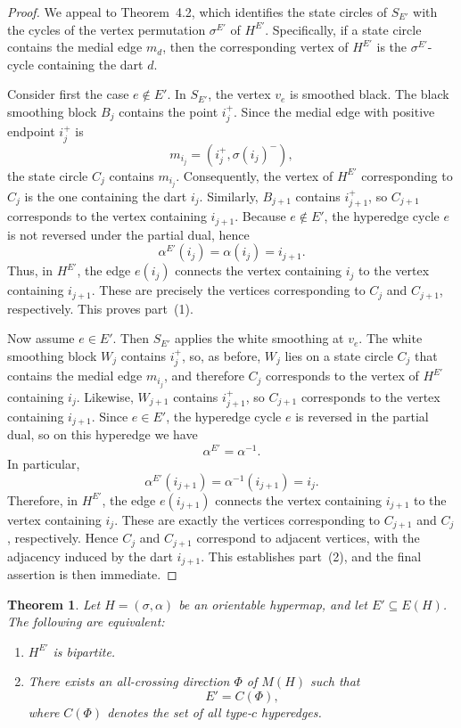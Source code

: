\documentclass{article}
\newtheorem{theorem}{Theorem}[section]
\begin{document}
\begin{proof}
We appeal to Theorem~4.2, which identifies the state circles of \(S_{E'}\) with
the cycles of the vertex permutation \(\sigma^{E'}\) of \(H^{E'}\).
Specifically, if a state circle contains the medial edge \(m_d\), then the
corresponding vertex of \(H^{E'}\) is the \(\sigma^{E'}\)-cycle containing the
dart \(d\).

Consider first the case \(e\notin E'\). In \(S_{E'}\), the vertex \(v_e\) is
smoothed black. The black smoothing block \(B_j\) contains the point
\(i_j^+\). Since the medial edge with positive endpoint \(i_j^+\) is
\[
m_{i_j}=(i_j^+,\sigma(i_j)^-),
\]
the state circle \(C_j\) contains \(m_{i_j}\). Consequently, the vertex of
\(H^{E'}\) corresponding to \(C_j\) is the one containing the dart \(i_j\).
Similarly, \(B_{j+1}\) contains \(i_{j+1}^+\), so \(C_{j+1}\) corresponds to
the vertex containing \(i_{j+1}\). Because \(e\notin E'\), the hyperedge cycle
\(e\) is not reversed under the partial dual, hence
\[
\alpha^{E'}(i_j)=\alpha(i_j)=i_{j+1}.
\]
Thus, in \(H^{E'}\), the edge \(e(i_j)\) connects the vertex containing
\(i_j\) to the vertex containing \(i_{j+1}\). These are precisely the
vertices corresponding to \(C_j\) and \(C_{j+1}\), respectively. This proves
part~(1).

Now assume \(e\in E'\). Then \(S_{E'}\) applies the white smoothing at
\(v_e\). The white smoothing block \(W_j\) contains \(i_j^+\), so, as before,
\(W_j\) lies on a state circle \(C_j\) that contains the medial edge
\(m_{i_j}\), and therefore \(C_j\) corresponds to the vertex of \(H^{E'}\)
containing \(i_j\). Likewise, \(W_{j+1}\) contains \(i_{j+1}^+\), so
\(C_{j+1}\) corresponds to the vertex containing \(i_{j+1}\). Since
\(e\in E'\), the hyperedge cycle \(e\) is reversed in the partial dual, so on
this hyperedge we have
\[
\alpha^{E'}=\alpha^{-1}.
\]
In particular,
\[
\alpha^{E'}(i_{j+1})=\alpha^{-1}(i_{j+1})=i_j.
\]
Therefore, in \(H^{E'}\), the edge \(e(i_{j+1})\) connects the vertex
containing \(i_{j+1}\) to the vertex containing \(i_j\). These are exactly
the vertices corresponding to \(C_{j+1}\) and \(C_j\), respectively. Hence
\(C_j\) and \(C_{j+1}\) correspond to adjacent vertices, with the adjacency
induced by the dart \(i_{j+1}\). This establishes part~(2), and the final
assertion is then immediate.
\end{proof}

\begin{theorem}\label{thm:bip-char}
Let $H=(\sigma,\alpha)$ be an orientable hypermap, and let $E'\subseteq E(H)$. The following are equivalent:
\begin{enumerate}
  \item $H^{E'}$ is bipartite.
  \item There exists an all-crossing direction $\Phi$ of $M(H)$ such that
  \[
  E'=C(\Phi),
  \] where $C(\Phi)$ denotes the set of all type-$c$ hyperedges.
\end{enumerate}
\end{theorem}
\end{document}
